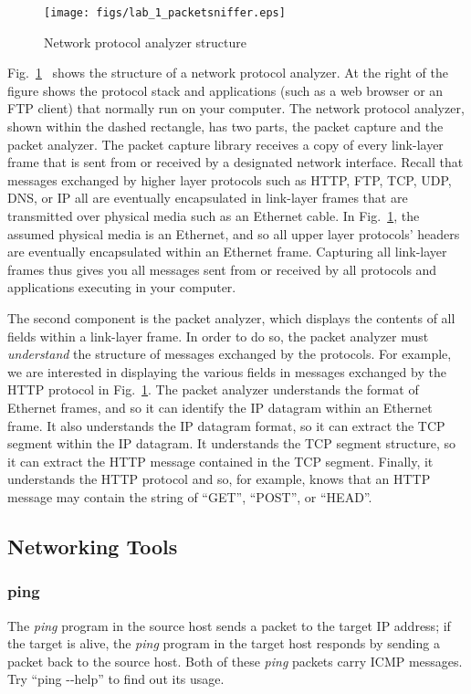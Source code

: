 \begin{figure}[h]
\centering
 \texttt{[image: figs/lab\_1\_packetsniffer.eps]}
  \caption{Network protocol analyzer structure}\label{packetsniffer}
\end{figure}

Fig.~\ref{packetsniffer}~\cite{umass} shows the structure of a network
protocol analyzer. At the right of the figure shows the protocol stack
and applications (such as a web browser or an FTP client) that normally
run on your computer. The network protocol analyzer, shown within the
dashed rectangle, has two parts, the packet capture and the packet
analyzer.  The packet capture library receives a copy of every
link-layer frame that is sent from or received by a designated network
interface.  Recall that messages exchanged by higher layer protocols
such as HTTP, FTP, TCP, UDP, DNS, or IP all are eventually
encapsulated in link-layer frames that are transmitted over physical
media such as an Ethernet cable. In Fig.~\ref{packetsniffer}, the
assumed physical media is an Ethernet, and so all upper layer
protocols' headers are eventually encapsulated within an Ethernet frame.
Capturing all link-layer frames thus gives you all messages sent from
or received by all protocols and applications executing in your
computer.

The second component is the packet analyzer,
which displays the contents of all fields within a link-layer frame.
In order to do so, the packet analyzer must {\em understand} the
structure of messages exchanged by the protocols. For example,
 we are interested in displaying the various fields in
messages exchanged by the HTTP protocol in Fig.~\ref{packetsniffer}.
The packet analyzer understands the format of Ethernet frames, and
so it can identify the IP datagram within an Ethernet frame. It also
understands the IP datagram format, so it can extract the TCP
segment within the IP datagram. It understands the TCP
segment structure, so it can extract the HTTP message contained in
the TCP segment. Finally, it understands the HTTP protocol and so,
for example, knows that an HTTP message may
contain the string of ``GET'', ``POST'', or ``HEAD''.

\subsection{Networking Tools}

\subsubsection{ping}
\par The {\em ping} program in the source host sends a packet to the
target IP address; if the target is alive, the {\em ping} program in
the target host responds by sending a packet back to the source host.
Both of these {\em ping} packets carry ICMP messages. Try ``ping -\--help'' to find out its usage.

